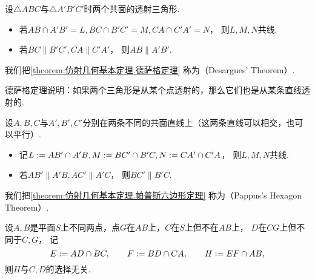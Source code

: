 \begin{theorem}\label{theorem:仿射几何基本定理.德萨格定理}
设\(\triangle ABC\)与\(\triangle A'B'C'\)时两个共面的透射三角形.
\begin{itemize}
	\item 若\(
		AB \cap A'B' = L,
		BC \cap B'C' = M,
		CA \cap C'A' = N
	\)，
	则\(L,M,N\)共线.

	\item 若\(
		BC \parallel B'C',
		CA \parallel C'A'
	\)，
	则\(AB \parallel A'B'\).
\end{itemize}
\end{theorem}

我们把\cref{theorem:仿射几何基本定理.德萨格定理}
称为（Desargues' Theorem）.

德萨格定理说明：如果两个三角形是从某个点透射的，那么它们也是从某条直线透射的.

\begin{theorem}\label{theorem:仿射几何基本定理.帕普斯六边形定理}
设\(A,B,C\)与\(A',B',C'\)分别在两条不同的共面直线上（这两条直线可以相交，也可以平行）.
\begin{itemize}
	\item 记\(
		L := AB' \cap A'B,
		M := BC' \cap B'C,
		N := CA' \cap C'A
	\)，
	则\(L,M,N\)共线.

	\item 若\(
		AB' \parallel A'B,
		AC' \parallel A'C
	\)，
	则\(BC' \parallel B'C\).
\end{itemize}
\end{theorem}

我们把\cref{theorem:仿射几何基本定理.帕普斯六边形定理}
称为（Pappus's Hexagon Theorem）.

\begin{theorem}\label{theorem:仿射几何基本定理.帕普斯调和定理}
设\(A,B\)是平面\(S\)上不同两点，点\(G\)在\(AB\)上，\(C\)在\(S\)上但不在\(AB\)上，
\(D\)在\(CG\)上但不同于\(C,G\)，
记\begin{equation*}
	E := AD \cap BC,
	\qquad
	F := BD \cap CA,
	\qquad
	H := EF \cap AB,
\end{equation*}
则\(H\)与\(C,D\)的选择无关.
\end{theorem}

